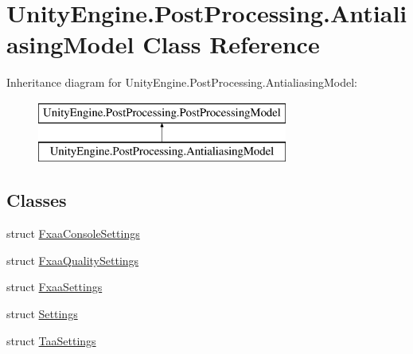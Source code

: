 \hypertarget{class_unity_engine_1_1_post_processing_1_1_antialiasing_model}{}\section{Unity\+Engine.\+Post\+Processing.\+Antialiasing\+Model Class Reference}
\label{class_unity_engine_1_1_post_processing_1_1_antialiasing_model}
Inheritance diagram for Unity\+Engine.\+Post\+Processing.\+Antialiasing\+Model\+:\begin{figure}[H]
\begin{center}
\leavevmode
\includegraphics[height=2.000000cm]{class_unity_engine_1_1_post_processing_1_1_antialiasing_model}
\end{center}
\end{figure}
\subsection*{Classes}
\begin{DoxyCompactItemize}
\item 
struct \mbox{\hyperlink{struct_unity_engine_1_1_post_processing_1_1_antialiasing_model_1_1_fxaa_console_settings}{Fxaa\+Console\+Settings}}
\item 
struct \mbox{\hyperlink{struct_unity_engine_1_1_post_processing_1_1_antialiasing_model_1_1_fxaa_quality_settings}{Fxaa\+Quality\+Settings}}
\item 
struct \mbox{\hyperlink{struct_unity_engine_1_1_post_processing_1_1_antialiasing_model_1_1_fxaa_settings}{Fxaa\+Settings}}
\item 
struct \mbox{\hyperlink{struct_unity_engine_1_1_post_processing_1_1_antialiasing_model_1_1_settings}{Settings}}
\item 
struct \mbox{\hyperlink{struct_unity_engine_1_1_post_processing_1_1_antialiasing_model_1_1_taa_settings}{Taa\+Settings}}
\end{DoxyCompactItemize}
